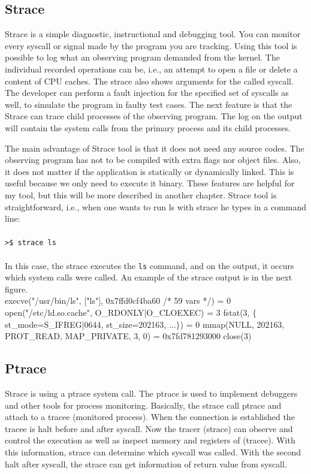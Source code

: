 \subsection{Strace}
\label{sec:strace}

Strace \cite{strace_man} is a simple diagnostic, instructional and debugging tool.
You can monitor every syscall or signal made by the program you are tracking.
Using this tool is possible to log what an observing program demanded from the kernel.
The individual recorded operations can be, i.e., an attempt to open a file or delete a content of CPU caches.
The strace also shows arguments for the called syscall.
The developer can perform a fault injection for the specified set of syscalls as well, to simulate the program in faulty test cases.
The next feature is that the Strace can trace child processes of the observing program.
The log on the output will contain the system calls from the primary process and its child processes.

The main advantage of Strace tool is that it does not need any source codes.
The observing program has not to be compiled with extra flags nor object files.
Also, it does not matter if the application is statically or dynamically linked.
This is useful because we only need to execute it binary.
These features are helpful for my tool, but this will be more described in another chapter.
Strace tool is straightforward, i.e., when one wants to run ls with strace he types in a command line:\\
\\
\texttt{>\$ strace ls}\\
\\
In this case, the strace executes the \texttt{ls} command, and on the output, it occurs which system calls were called.
An example of the strace output is in the next figure.\\[2mm]

\selectfont\noindent
execve("/usr/bin/ls", ["ls"], 0x7ffd0cf4ba60 /* 59 vars */) = 0\linebreak
open("/etc/ld.so.cache", O\_RDONLY|O\_CLOEXEC) = 3\linebreak
fstat(3, $\{$ st\_mode=S\_IFREG|0644, st\_size=202163, ...$\}$) = 0\linebreak
mmap(NULL, 202163, PROT\_READ, MAP\_PRIVATE, 3, 0) = 0x7fd781293000\linebreak
close(3)\linebreak
\fontfamily{\familydefault}\selectfont

\subsection{Ptrace}
Strace is using a ptrace \cite{ptrace_man} system call.
The ptrace is used to  implement debuggers and other tools for process monitoring.
Basically, the strace call ptrace and attach to a tracee (monitored process).
When the connection is established the tracee is halt before and after syscall.
Now the tracer (strace) can observe and control the execution as well as inspect memory and registers of (tracee).
With this information, strace can determine which syscall was called.
With the second halt after syscall, the strace can get information of return value from syscall.

